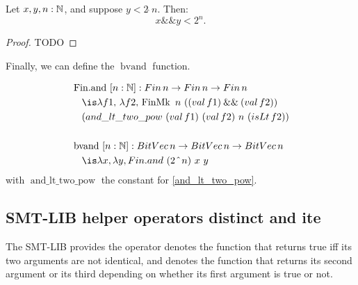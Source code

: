 \begin{lemma}
Let \( x, y, n : \mathbb{N} \), and suppose \( y < 2 \,\hat{}\, n \). Then:
\[
x \mathbin{\&\&} y < 2^n.
\]
\label{and_lt_two_pow}
\begin{proof} TODO \end{proof}
\end{lemma}

Finally, we can define the $\mathop{bvand}$ function.

\begin{definition}
\begin{align*}
&\mathop{\mathrm{Fin.and}}~[n: \N]: \mathop{Fin} n \ra \mathop{Fin} n \ra \mathop{Fin} n\\
&\quad\is \lambda f1,\, \lambda f2,\, \mathop{\mathrm{FinMk}}~n~((\mathop{val} f1) \mathbin{\&\&} (\mathop{val} f2)) \\
&\quad (\mathop{and\_lt\_two\_pow}~(\mathop{val} f1)~(\mathop{val} f2)~n~(\mathop{isLt} f2)) \\
&\\
&\mathop{\mathrm{bvand}}~[n: \N]: \mathop{BitVec} n \ra \mathop{BitVec} n \ra \mathop{BitVec} n\\
&\quad\is \lambda x, \lambda y, \mathop{Fin.and}~(2~\hat{}~n)~x~y
\end{align*}
with $\mathop{and\_lt\_two\_pow}$ the constant for \cref{and_lt_two_pow}.
\end{definition}

\subsection{SMT-LIB helper operators distinct and ite}
\label{ssec:encoding-distinct-let-enc}

The SMT-LIB provides the operator   denotes the function that
returns true iff its two arguments are not identical, and  denotes the function that
returns its second argument or its third depending on whether its first argument is true or not.



